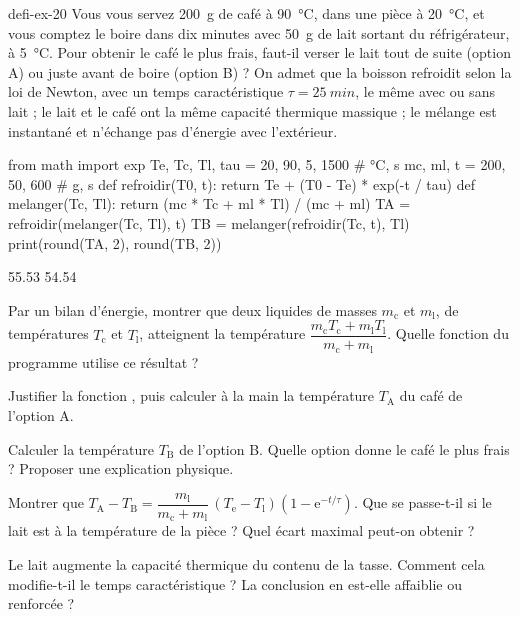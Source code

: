 \begin{blocEdition}{defi-ex-20}
Vous vous servez \qty{200}{g} de café à \qty{90}{\degreeCelsius}, dans une pièce à \qty{20}{\degreeCelsius}, et vous comptez le boire
dans dix minutes avec \qty{50}{g} de lait sortant du réfrigérateur, à \qty{5}{\degreeCelsius}. Pour obtenir le café le plus frais,
faut-il verser le lait tout de suite (option A) ou juste avant de boire (option B) ? On admet que la boisson refroidit
selon la loi de Newton, avec un temps caractéristique $\tau=\qty{25}{min}$, le même avec ou sans lait ; le lait et le café
ont la même capacité thermique massique ; le mélange est instantané et n'échange pas d'énergie avec l'extérieur.
\begin{codecote}[0.66]
\begin{pythoncol}
from math import exp
Te, Tc, Tl, tau = 20, 90, 5, 1500   # °C, s
mc, ml, t = 200, 50, 600            # g, s
def refroidir(T0, t):
    return Te + (T0 - Te) * exp(-t / tau)
def melanger(Tc, Tl):
    return (mc * Tc + ml * Tl) / (mc + ml)
TA = refroidir(melanger(Tc, Tl), t)
TB = melanger(refroidir(Tc, t), Tl)
print(round(TA, 2), round(TB, 2))
\end{pythoncol}
\cote
\begin{consolecol}
55.53 54.54
\end{consolecol}
\end{codecote}
\par\smallskip
\begin{questions}
\item Par un bilan d'énergie, montrer que deux liquides de masses $m_\mathrm{c}$ et $m_\mathrm{l}$, de températures $T_\mathrm{c}$ et
$T_\mathrm{l}$, atteignent la température $\dfrac{m_\mathrm{c}T_\mathrm{c}+m_\mathrm{l}T_\mathrm{l}}{m_\mathrm{c}+m_\mathrm{l}}$. Quelle fonction du programme
utilise ce résultat ?
\item Justifier la fonction , puis calculer à la main la température $T_\mathrm{A}$ du café de l'option A.
\item Calculer la température $T_\mathrm{B}$ de l'option B. Quelle option donne le café le plus frais ? Proposer une
explication physique.
\item Montrer que $T_\mathrm{A}-T_\mathrm{B}=\dfrac{m_\mathrm{l}}{m_\mathrm{c}+m_\mathrm{l}}\,(T_\mathrm{e}-T_\mathrm{l})\left(1-\mathrm{e}^{-t/\tau}\right)$.
Que se passe-t-il si le lait est à la température de la pièce ? Quel écart maximal peut-on obtenir ?
\item Le lait augmente la capacité thermique du contenu de la tasse. Comment cela modifie-t-il le temps caractéristique ?
La conclusion en est-elle affaiblie ou renforcée ?
\end{questions}
\end{blocEdition}

